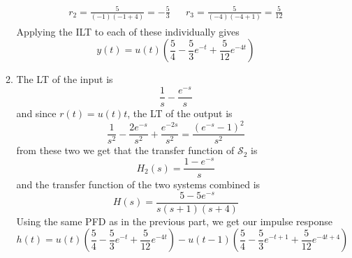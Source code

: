 \documentclass[12pt]{article}
\begin{document}
\begin{enumerate}
\begin{enumerate}
\begin{gather*}
\begin{aligned}
                                    r_2=\frac{5}{(-1)(-1+4)}=-\frac{5}{3} &  &
                                    r_3=\frac{5}{(-4)(-4+1)}=\frac{5}{12}
                              \end{aligned}
                        \end{gather*}
                        Applying the ILT to each of these individually gives
                        \[\boxed{y(t)=u(t)\left(\frac{5}{4}-\frac{5}{3}e^{-t}+\frac{5}{12}e^{-4t}\right)}\]
                  \item The LT of the input is
                        \[\frac{1}{s}-\frac{e^{-s}}{s}\]
                        and since $r(t)=u(t)t$, the LT of the output is
                        \[\frac{1}{s^2}-\frac{2e^{-s}}{s^2}+\frac{e^{-2s}}{s^2}
                              =\frac{\left(e^{-s}-1\right)^2}{s^2}\]
                        from these two we get that the transfer function of $\mathcal{S}_2$ is
                        \[H_2(s)=\frac{1-e^{-s}}{s}\]
                        and the transfer function of the two systems combined is
                        \[H(s)=\frac{5-5e^{-s}}{s(s+1)(s+4)}\]
                        Using the same PFD as in the previous part, we get our impulse response
                        \[\boxed{h(t)=u(t)\left(\frac{5}{4}-\frac{5}{3}e^{-t}+\frac{5}{12}e^{-4t}\right)
                        -u(t-1)\left(\frac{5}{4}-\frac{5}{3}e^{-t+1}+\frac{5}{12}e^{-4t+4}\right)}\]
            \end{enumerate}
\end{enumerate}
\end{document}
